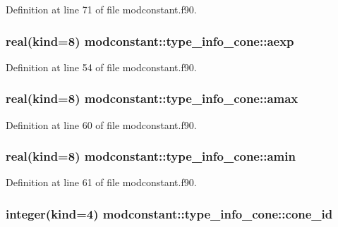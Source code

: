 Definition at line 71 of file modconstant.\-f90.

\hypertarget{structmodconstant_1_1type__info__cone_a282cf84b0f27f97f86d5efb8845f1a4b}{
\subsubsection[{aexp}]{\setlength{\rightskip}{0pt plus 5cm}real(kind=8) modconstant\-::type\-\_\-info\-\_\-cone\-::aexp}}\label{structmodconstant_1_1type__info__cone_a282cf84b0f27f97f86d5efb8845f1a4b}


Definition at line 54 of file modconstant.\-f90.

\hypertarget{structmodconstant_1_1type__info__cone_aeb9fe5dbc11a68e8e97255dcc9c4e563}{
\subsubsection[{amax}]{\setlength{\rightskip}{0pt plus 5cm}real(kind=8) modconstant\-::type\-\_\-info\-\_\-cone\-::amax}}\label{structmodconstant_1_1type__info__cone_aeb9fe5dbc11a68e8e97255dcc9c4e563}


Definition at line 60 of file modconstant.\-f90.

\hypertarget{structmodconstant_1_1type__info__cone_a8ae5805ef224ff1141bfadcb2c7bdf3e}{
\subsubsection[{amin}]{\setlength{\rightskip}{0pt plus 5cm}real(kind=8) modconstant\-::type\-\_\-info\-\_\-cone\-::amin}}\label{structmodconstant_1_1type__info__cone_a8ae5805ef224ff1141bfadcb2c7bdf3e}


Definition at line 61 of file modconstant.\-f90.

\hypertarget{structmodconstant_1_1type__info__cone_a461df4d2862ce0b7f4f26518c08bb7b6}{
\subsubsection[{cone\-\_\-id}]{\setlength{\rightskip}{0pt plus 5cm}integer(kind=4) modconstant\-::type\-\_\-info\-\_\-cone\-::cone\-\_\-id}}\label{structmodconstant_1_1type__info__cone_a461df4d2862ce0b7f4f26518c08bb7b6}


